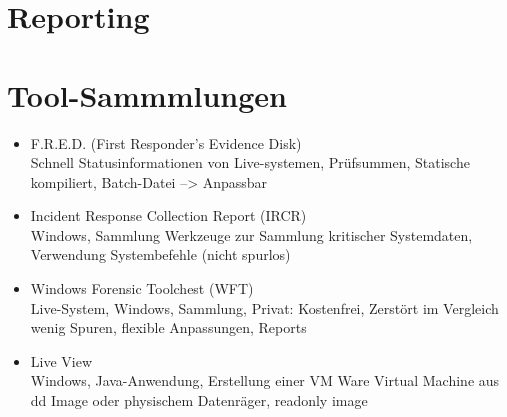 \section{Reporting}





\section{Tool-Sammmlungen}
\begin{itemize}
\item F.R.E.D. (First Responder's Evidence Disk)\\
Schnell Statusinformationen von Live-systemen, Prüfsummen, Statische kompiliert, Batch-Datei --> Anpassbar
\item Incident Response Collection Report (IRCR)\\
Windows, Sammlung Werkzeuge zur Sammlung kritischer Systemdaten, Verwendung Systembefehle (nicht spurlos)
\item Windows Forensic Toolchest (WFT)\\
Live-System, Windows, Sammlung, Privat: Kostenfrei, Zerstört im Vergleich wenig Spuren, flexible Anpassungen, Reports
\item Live View\\
Windows, Java-Anwendung, Erstellung einer VM Ware Virtual Machine aus dd Image oder physischem Datenräger, readonly image
\end{itemize}

